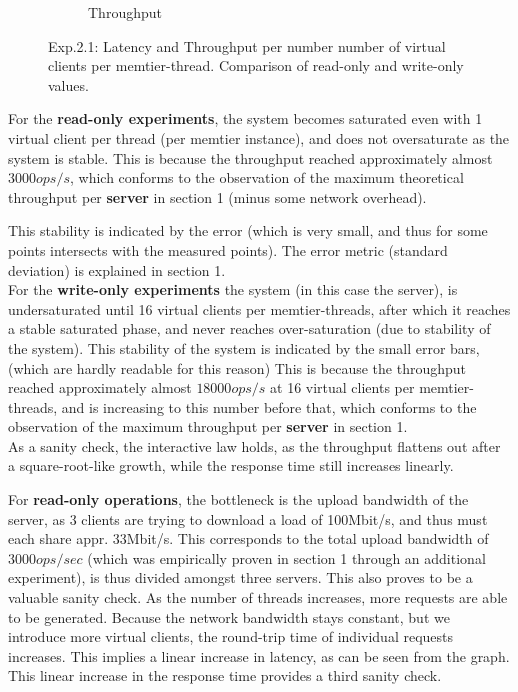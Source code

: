 \documentclass[11pt,a4paper]{article}
\begin{document}
\begin{figure}[H]
\begin{subfigure}{.5\textwidth}
    \caption{Throughput}
    \label{fig:mesh1}
\end{subfigure}
\caption{Exp.2.1: Latency and Throughput per number number of virtual clients per memtier-thread. Comparison of read-only and write-only values.}
\label{fig:test}
\end{figure}


For the \textbf{read-only experiments}, the system becomes saturated even with 1 virtual client per thread (per memtier instance), and does not oversaturate as the system is stable.
This is because the throughput reached approximately almost $3000ops/s$, which conforms to the observation of the maximum theoretical throughput per \textbf{server} in section 1 (minus some network overhead).

This stability is indicated by the error (which is very small, and thus for some points intersects with the measured points).
The error metric (standard deviation) is explained in section 1.\\

For the \textbf{write-only experiments} the system (in this case the server), is undersaturated until 16 virtual clients per memtier-threads, after which it reaches a stable saturated phase, and never reaches over-saturation (due to stability of the system).
This stability of the system is indicated by the small error bars, (which are hardly readable for this reason)
This is because the throughput reached approximately almost $18000ops/s$ at 16 virtual clients per memtier-threads, and is increasing to this number before that, which conforms to the observation of the maximum throughput per \textbf{server} in section 1.\\

As a sanity check, the interactive law holds, as the throughput flattens out after a square-root-like growth, while the response time still increases linearly.

For \textbf{read-only operations}, the bottleneck is the upload bandwidth of the server,
as 3 clients are trying to download a load of 100Mbit/s, and thus must each share appr. 33Mbit/s.
This corresponds to the total upload bandwidth of $3000ops/sec$ (which was empirically proven in section 1 through an additional experiment), is thus divided amongst  three servers.
This also proves to be a valuable sanity check.
As the number of threads increases, more requests are able to be generated.
Because the network bandwidth stays constant, but we introduce more virtual clients, the round-trip time of individual requests increases.
This implies a linear increase in latency, as can be seen from the graph.
This linear increase in the response time provides a third sanity check.
\end{document}

